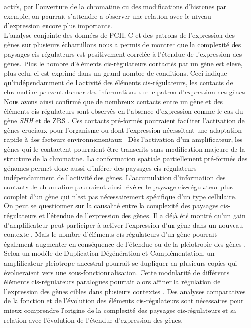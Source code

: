 actifs, par l’ouverture de la chromatine ou des modifications d’histones par exemple, on pourrait s’attendre a observer une relation avec le niveau d’expression encore plus importante. \\

L’analyse conjointe des données de \acrshort{PCHi-C} et des patrons de l’expression des gènes sur plusieurs échantillons nous a permis de montrer que la complexité des paysages \gls{cis}-régulateurs est positivement corrélée à l’étendue de l’expression des gènes. Plus le nombre d’éléments \gls{cis}-régulateurs contactés par un gène est elevé, plus celui-ci est exprimé dans un grand nombre de \glspl{condition}. Ceci indique qu’indépendamment de l’activité des éléments \gls{cis}-régulateurs, les contacts de chromatine peuvent donner des informations sur le patron d’expression des gènes. Nous avons ainsi confirmé que de nombreux contacts entre un gène et des éléments \gls{cis}-régulateurs sont observés en l’absence d’expression comme le cas du gène \textit{SHH} et de ZRS \citep{schoenfelder_pluripotent_2015}. Ces contacts pré-formés pourraient faciliter l'activation de gènes cruciaux pour l’organisme ou dont l’expression nécessitent une adaptation rapide à des facteurs environnementaux \citep{ing-simmons_independence_2021}. Dès l’activation d’un amplificateur, les gènes qui le contactent pourraient être transcrits sans modification majeure de la structure de la chromatine. La conformation spatiale partiellement pré-formée des génomes permet donc aussi d’inférer des paysages \gls{cis}-régulateurs indépendamment de l’activité des gènes. L’accumulation d’information des contacts de chromatine pourraient ainsi révéler le paysage \gls{cis}-régulateur plus complet d’un gène qui n’est pas nécessairement spécifique d’un type cellulaire. \\

On peut se questionner sur la causalité entre la complexité des paysages \gls{cis}-régulateurs et l’étendue de l’expression des gènes. Il a déjà été montré qu’un gain d’\gls{amplificateur} peut participer à activer l’expression d’un gène dans un nouveau contexte \citep{rebeiz_evolutionary_2011, thompson_novel_2018}. Mais le nombre d’éléments \gls{cis}-régulateurs d’un gène pourrait également augmenter en conséquence de l’étendue ou de la pléiotropie des gènes \citep{monteiro_identifying_2016}. Selon un modèle de Duplication Dégénération et Complémentation, un \gls{amplificateur} \gls{pleiotrope} ancestral pourrait se dupliquer en plusieurs copies qui évolueraient vers une sous-fonctionnalisation. Cette modularité de différents éléments \gls{cis}-régulateurs paralogues pourrait alors affiner la régulation de l’expression des gènes cibles dans plusieurs contextes \citep{murugesan_evolution_2022}. Des analyses comparatives de la fonction et de l’évolution des éléments \gls{cis}-régulateurs sont nécessaires pour mieux comprendre l’origine de la complexité des paysages \gls{cis}-régulateurs et sa relation avec l’évolution de l’étendue d’expression des gènes.

